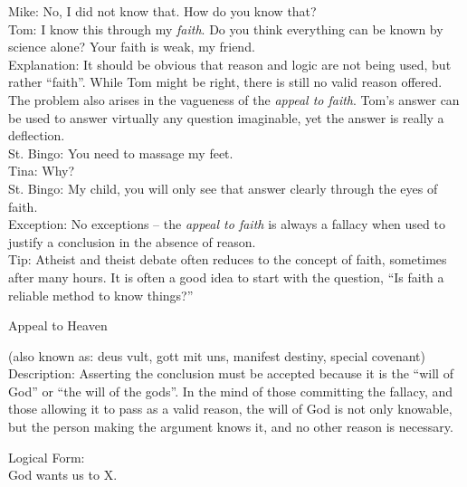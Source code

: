 \documentclass[a4paper,12pt,single,pdftex]{scrartcl}
\begin{document}
{    
      Mike: No, I did not know that.  How do you know that?
    \\

    
      Tom: I know this through my {\it faith}.  Do you think everything can be known by science alone?  Your faith is weak, my friend.
    \\

    
      Explanation: It should be obvious that reason and logic are not being used, but rather “faith”.  While Tom might be right, there is still no valid reason offered.  The problem also arises in the vagueness of the {\it appeal to faith}.  Tom’s answer can be used to answer virtually any question imaginable, yet the answer is really a deflection.
    \\

    
      St. Bingo: You need to massage my feet.
    \\

    
      Tina: Why?
    \\

    
      St. Bingo: My child, you will only see that answer clearly through the eyes of faith.
    \\

    
      Exception: No exceptions -- the {\it appeal to faith} is always a fallacy when used to justify a conclusion in the absence of reason.
    \\

    
      Tip: Atheist and theist debate often reduces to the concept of faith, sometimes after many hours. It is often a good idea to start with the question, “Is faith a reliable method to know things?” 
    \\

  }


Appeal to Heaven
    
      (also known as: deus vult, gott mit uns, manifest destiny, special covenant)
    \\

  
    Description: Asserting the conclusion must be accepted because it is the “will of God” or “the will of the gods”.  In the mind of those committing the fallacy, and those allowing it to pass as a valid reason, the will of God is not only knowable, but the person making the argument knows it, and no other reason is necessary.

    
      Logical Form:
    \\

    
      God wants us to X.
    \\
\end{document}
